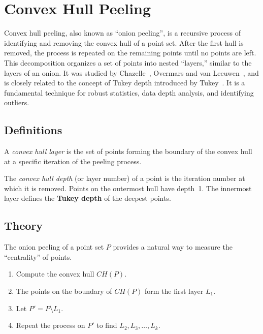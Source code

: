 \section{Convex Hull Peeling}
\label{sec:convex_hull_peeling}

Convex hull peeling, also known as ``onion peeling'', is a recursive process of identifying and removing the convex hull of a point set. After the first hull is removed, the process is repeated on the remaining points until no points are left. This decomposition organizes a set of points into nested ``layers,'' similar to the layers of an onion. It was studied by Chazelle~\cite{chazelle1985}, Overmars and van Leeuwen~\cite{overmars1981}, and is closely related to the concept of Tukey depth introduced by Tukey~\cite{tukey1975}. It is a fundamental technique for robust statistics, data depth analysis, and identifying outliers.

\subsection{Definitions}

\begin{definition}\label{def:hull_layer}
A \emph{convex hull layer} is the set of points forming the boundary of the convex hull at a specific iteration of the peeling process.
\end{definition}

\begin{definition}\label{def:hull_depth}
The \emph{convex hull depth} (or layer number) of a point is the iteration number at which it is removed. Points on the outermost hull have depth~1. The innermost layer defines the \textbf{Tukey depth} of the deepest points.
\end{definition}

\subsection{Theory}

The onion peeling of a point set $P$ provides a natural way to measure the ``centrality'' of points.
\begin{enumerate}
\item Compute the convex hull $CH(P)$.
\item The points on the boundary of $CH(P)$ form the first layer $L_1$.
\item Let $P' = P \setminus L_1$.
\item Repeat the process on $P'$ to find $L_2, L_3, \dots, L_k$.
\end{enumerate}

